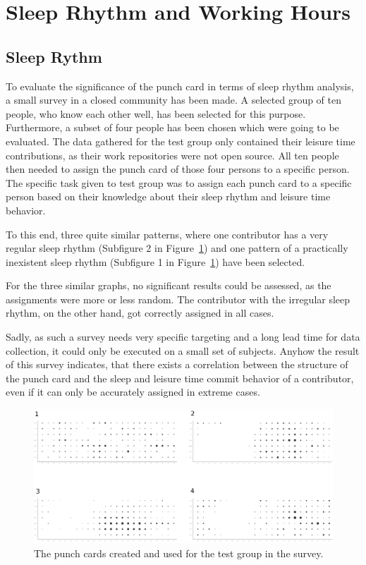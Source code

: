 \section{Sleep Rhythm and Working Hours}

\subsection{Sleep Rythm}
To evaluate the significance of the punch card in terms of sleep rhythm analysis, a small survey in a closed community has been made.
A selected group of ten people, who know each other well, has been selected for this purpose.
Furthermore, a subset of four people has been chosen which were going to be evaluated.
The data gathered for the test group only contained their leisure time contributions, as their work repositories were not open source.
All ten people then needed to assign the punch card of those four persons to a specific person.
The specific task given to test group was to assign each punch card to a specific person based on their knowledge about their sleep rhythm and leisure time behavior.

To this end, three quite similar patterns, where one contributor has a very regular sleep rhythm (Subfigure 2 in Figure~\ref{fig:punchcard-survey}) and one pattern of a practically inexistent sleep rhythm (Subfigure 1 in Figure~\ref{fig:punchcard-survey}) have been selected.

For the three similar graphs, no significant results could be assessed, as the assignments were more or less random.
The contributor with the irregular sleep rhythm, on the other hand, got correctly assigned in all cases.

Sadly, as such a survey needs very specific targeting and a long lead time for data collection, it could only be executed on a small set of subjects.
Anyhow the result of this survey indicates, that there exists a correlation between the structure of the punch card and the sleep and leisure time commit behavior of a contributor, even if it can only be accurately assigned in extreme cases.


\begin{figure}[H]
    \includegraphics[scale=0.16]{./graphs/analysis/survey_combined}
    \centering
    \caption{The punch cards created and used for the test group in the survey.}\label{fig:punchcard-survey}
\end{figure}

